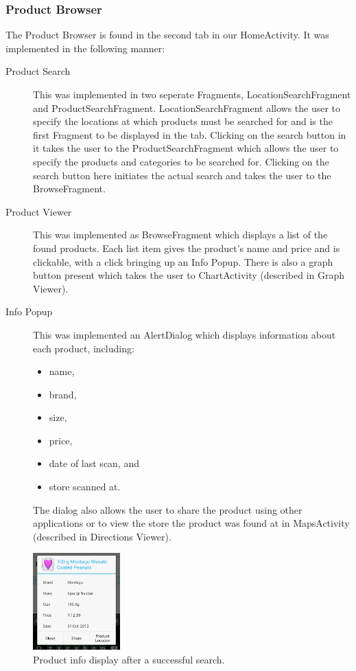 \subsubsection{Product Browser}
The Product Browser is found in the second tab in our HomeActivity. It was
implemented in the following manner:
\begin{description}
\item[Product Search] This was implemented in two seperate Fragments,
LocationSearchFragment and ProductSearchFragment. LocationSearchFragment allows
the user to specify the locations at which products must be searched for and is
the first Fragment to be displayed in the tab. Clicking on the search button in
it takes the user to the ProductSearchFragment which allows the user to specify
the products and categories to be searched for. Clicking on the search button
here initiates the actual search and takes the user to the BrowseFragment.
\item[Product Viewer] This was implemented as BrowseFragment which displays a
list of the found products. Each list item gives the product's name and price
and is clickable, with a click bringing up an Info Popup. There is also a graph
button present which takes the user to ChartActivity (described in Graph
Viewer).
\item[Info Popup] This was implemented an AlertDialog which displays
information about each product, including:
\begin{itemize}
  \item name,
  \item brand,
  \item size,
  \item price,
  \item date of last scan, and
  \item store scanned at.
\end{itemize} 
The dialog also allows the user to share the product using other applications or
to view the store the product was found at in MapsActivity (described in
Directions Viewer).
\end{description}
\begin{figure}[h!]
\centering
\includegraphics[width=0.3\textwidth]{product-info.png}
\caption{Product info display after a successful search.}
\end{figure}